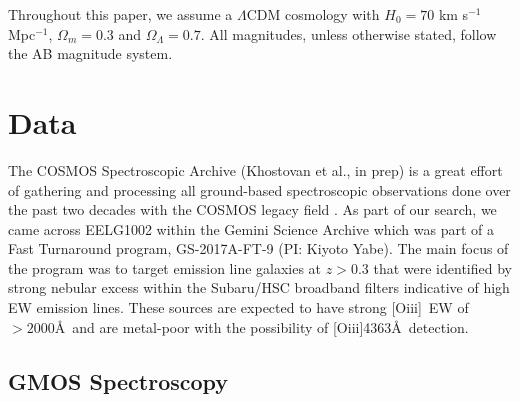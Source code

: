 \documentclass[twocolumn,tight,times,linenumbers]{aastex631}
\newcommand{\oiii}{[O{\sc iii}]}
\begin{document}
            
            Throughout this paper, we assume a $\Lambda$CDM cosmology with $H_0 = 70$ km s$^{-1}$ Mpc$^{-1}$, $\Omega_m = 0.3$ and $\Omega_\Lambda = 0.7$. All magnitudes, unless otherwise stated, follow the AB magnitude system.
            	
		\section{Data}
		\label{sec:data}
		
		The COSMOS Spectroscopic Archive (Khostovan et al., in prep) is a great effort of gathering and processing all ground-based spectroscopic observations done over the past two decades with the COSMOS legacy field \citep{Scoville2007}. As part of our search, we came across EELG1002 within the Gemini Science Archive which was part of a Fast Turnaround program, GS-2017A-FT-9 (PI: Kiyoto Yabe). The main focus of the program was to target emission line galaxies at $z > 0.3$ that were identified by strong nebular excess within the Subaru/HSC broadband filters indicative of high EW emission lines. These sources are expected to have strong \oiii~EW of $>2000$\AA~and are metal-poor with the possibility of \oiii4363\AA~detection. 
		
		\subsection{GMOS Spectroscopy}
		
\end{document}
